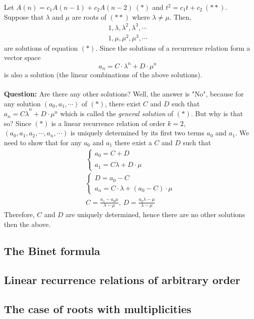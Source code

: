 Let $A(n)=c_1 A(n-1) + c_2 A(n-2)\ (*)$ and $t^2=c_1t +c_2\ (**)$. Suppose that $\lambda$ and $\mu$ are roots of $(**)$ where $\lambda \neq \mu$.
Then, 
\begin{align*}
1, \lambda, \lambda^2, \lambda^3, \cdots \\
1, \mu, \mu^2, \mu^3, \cdots
\end{align*}
are solutions of equation $(*)$. Since the solutions of a recurrence relation form a vector space 
$$
a_n=C \cdot \lambda^n + D \cdot \mu^n 
$$
is also a solution (the linear combinations of the above solutions).\\\\
\textbf{Question:} Are there any other solutions? 
\newpage
Well, the answer is "No", because for any solution $(a_0, a_1, \cdots)$ of $(*)$, there exist $C$
 and $D$ such that $a_n=C \dot \lambda^n + D \cdot \mu^n$ which is called the \textit{general solution} of $(*)$. But why is that so?
Since $(*)$ is a linear recurrence relation of order $k=2$, $(a_0, a_1, a_2, \cdots, a_n, \cdots)$ is uniquely determined by its first two terms $a_0$ and $a_1$.
We need to show that for any $a_0$ and $a_1$ there exist a $C$ and $D$ such that
\begin{align*}
&\begin{cases}
    a_0 = C + D\\    
    a_1 = C \dot \lambda + D \cdot \mu   
\end{cases}\\
&\begin{cases}
    D = a_0 - C\\    
    a_n = C \cdot \lambda + (a_0 - C) \cdot \mu   
\end{cases}\\
&
C=\frac{a_1 - a_0 \mu}{\lambda - \mu},\ D=\frac{a_0 \lambda - \mu}{\lambda - \mu} 
\end{align*}
\noindent
Therefore, $C$ and $D$ are uniquely determined, hence there are no other solutions then the above.

\subsection{The Binet formula}

\subsection{Linear recurrence relations of arbitrary order}

\subsection{The case of roots with multiplicities}

